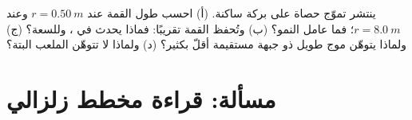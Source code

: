 \begin{exercise}[$\star\star\star$]\label{exo:g12:mechanical-waves:15}
ينتشر تموّج حصاة على بركة ساكنة. (أ) احسب طول
القمة عند $r = \qty{0.50}{m}$ وعند $r = \qty{8.0}{m}$؛ فما عامل النمو؟
(ب) وتُحفظ  القمة تقريبًا: فماذا يحدث 
في ، وللسعة؟ (ج) ولماذا يتوهّن موج طويل ذو جبهة مستقيمة
أقلّ بكثير؟ (د) ولماذا لا تتوهّن  الملعب البتة؟
\end{exercise}

\section{مسألة: قراءة مخطط زلزالي}

